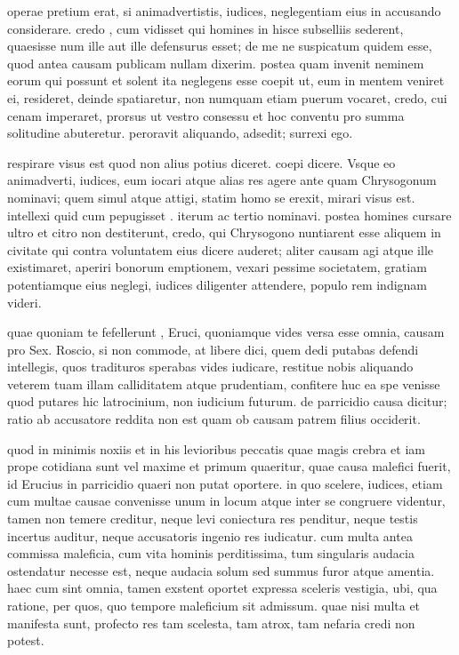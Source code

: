  operae pretium erat, si animadvertistis, iudices, neglegentiam eius in accusando considerare. credo , cum vidisset qui homines in hisce subselliis sederent, quaesisse num ille aut ille defensurus esset; de me ne suspicatum quidem esse, quod antea causam publicam nullam dixerim. postea quam invenit neminem eorum qui possunt et solent ita neglegens esse coepit ut, eum in mentem veniret ei, resideret, deinde spatiaretur, non numquam etiam puerum vocaret, credo, cui cenam imperaret, prorsus ut vestro consessu et hoc conventu pro summa solitudine abuteretur. peroravit aliquando, adsedit; surrexi ego.

 respirare visus est quod non alius potius diceret. coepi dicere. Vsque eo animadverti, iudices, eum iocari atque alias res agere ante quam Chrysogonum nominavi; quem simul atque attigi, statim homo se erexit, mirari visus est. intellexi quid cum pepugisset . iterum ac tertio nominavi. postea homines cursare ultro et citro non destiterunt, credo, qui Chrysogono nuntiarent esse aliquem in civitate qui contra voluntatem eius dicere auderet; aliter causam agi atque ille existimaret, aperiri bonorum emptionem, vexari pessime societatem, gratiam potentiamque eius neglegi, iudices diligenter attendere, populo rem indignam videri.

 quae quoniam te fefellerunt , Eruci, quoniamque vides versa esse omnia, causam pro Sex. Roscio, si non commode, at libere dici, quem dedi putabas defendi intellegis, quos tradituros sperabas vides iudicare, restitue nobis aliquando veterem tuam illam calliditatem atque prudentiam, confitere huc ea spe venisse quod putares hic latrocinium, non iudicium futurum. de parricidio causa dicitur; ratio ab accusatore reddita non est quam ob causam patrem filius occiderit.

 quod in minimis noxiis et in his levioribus peccatis quae magis crebra et iam prope cotidiana sunt vel maxime et primum quaeritur, quae causa malefici fuerit, id Erucius in parricidio quaeri non putat oportere. in quo scelere, iudices, etiam cum multae causae convenisse unum in locum atque inter se congruere videntur, tamen non temere creditur, neque levi coniectura res penditur, neque testis incertus auditur, neque accusatoris ingenio res iudicatur. cum multa antea commissa maleficia, cum vita hominis perditissima, tum singularis audacia ostendatur necesse est, neque audacia solum sed summus furor atque amentia. haec cum sint omnia, tamen exstent oportet expressa sceleris vestigia, ubi, qua ratione, per quos, quo tempore maleficium sit admissum. quae nisi multa et manifesta sunt, profecto res tam scelesta, tam atrox, tam nefaria credi non potest.

